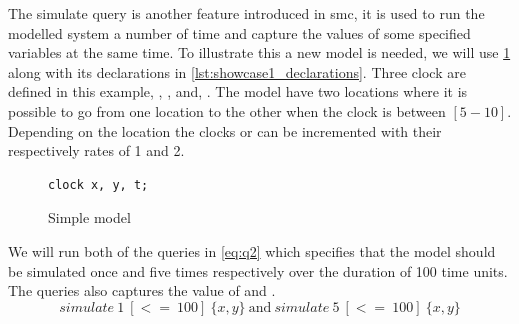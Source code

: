 The simulate query is another feature introduced in \gls{smc}, it is used to run the modelled system a number of time and capture the values of some specified variables at the same time.
To illustrate this a new model is needed, we will use \cref{fig:showcase01} along with its declarations in \cref{lst:showcase1_declarations}.
Three clock are defined in this example, , , and, .
The model have two locations where it is possible to go from one location to the other when the clock  is between $[5-10]$.
Depending on the location the clocks  or  can be incremented with their respectively rates of 1 and 2.
\begin{figure}[H]
	\begin{lstlisting}[language=my_c, caption={Declarations}, label=lst:showcase1_declarations]
	clock x, y, t;
	\end{lstlisting}
\end{figure}
\begin{figure}[H]
	\centering
	\caption{Simple model}
	\label{fig:showcase01}
\end{figure}

We will run both of the queries in \ref{eq:q2} which specifies that the model should be simulated once and five times respectively over the duration of 100 time units.
The queries also captures the value of  and .
\begin{equation}\label{eq:q2}
simulate\ 1\ [<=\ 100]\ \{x,y\}\ \text{and}\ 
simulate\ 5\ [<=\ 100]\ \{x,y\}
\end{equation}

